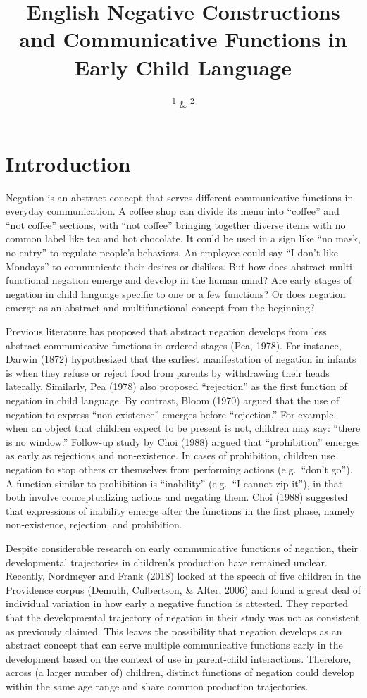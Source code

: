 \documentclass[
  english,
  man,floatsintext]{apa6}
\title{English Negative Constructions and Communicative Functions in Early Child Language}
\author{\textsuperscript{1} \& \textsuperscript{2}}
\date{}
\affiliation{\vspace{0.5cm}\textsuperscript{1} \\\textsuperscript{2} }
\begin{document}
\maketitle

\hypertarget{introduction}{%
\section{Introduction}\label{introduction}}

Negation is an abstract concept that serves different communicative functions in everyday communication. A coffee shop can divide its menu into ``coffee'' and ``not coffee'' sections, with ``not coffee'' bringing together diverse items with no common label like tea and hot chocolate. It could be used in a sign like ``no mask, no entry'' to regulate people's behaviors. An employee could say ``I don't like Mondays'' to communicate their desires or dislikes. But how does abstract multi-functional negation emerge and develop in the human mind? Are early stages of negation in child language specific to one or a few functions? Or does negation emerge as an abstract and multifunctional concept from the beginning?

Previous literature has proposed that abstract negation develops from less abstract communicative functions in ordered stages (Pea, 1978). For instance, Darwin (1872) hypothesized that the earliest manifestation of negation in infants is when they refuse or reject food from parents by withdrawing their heads laterally. Similarly, Pea (1978) also proposed ``rejection'' as the first function of negation in child language. By contrast, Bloom (1970) argued that the use of negation to express ``non-existence'' emerges before ``rejection.'' For example, when an object that children expect to be present is not, children may say: ``there is no window.'' Follow-up study by Choi (1988) argued that ``prohibition'' emerges as early as rejections and non-existence. In cases of prohibition, children use negation to stop others or themselves from performing actions (e.g.~``don't go''). A function similar to prohibition is ``inability'' (e.g.~``I cannot zip it''), in that both involve conceptualizing actions and negating them. Choi (1988) suggested that expressions of inability emerge after the functions in the first phase, namely non-existence, rejection, and prohibition.

Despite considerable research on early communicative functions of negation, their developmental trajectories in children's production have remained unclear. Recently, Nordmeyer and Frank (2018) looked at the speech of five children in the Providence corpus (Demuth, Culbertson, \& Alter, 2006) and found a great deal of individual variation in how early a negative function is attested. They reported that the
developmental trajectory of negation in their study was not as consistent as previously claimed. This leaves the possibility that negation develops as an abstract concept that can serve multiple communicative functions early in the development based on the context of use in parent-child interactions. Therefore, across (a larger number of) children, distinct functions of negation could develop within the same age range and share common production trajectories.
\end{document}
